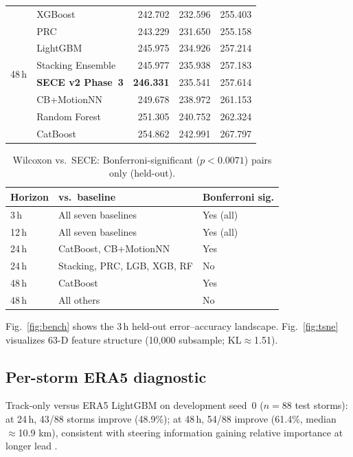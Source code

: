\documentclass[11pt]{article}
\newcommand{\sece}{SECE}
\newcommand{\era}{ERA5}
\newcommand{\km}{\,km}
\newcommand{\bonf}{0.0071}
\begin{document}
\begin{table}[t]
\begin{tabular}{@{}llrrr@{}}
\midrule
\multirow{8}{*}{48\,h}
  & XGBoost & 242.702 & 232.596 & 255.403 \\
  & PRC & 243.229 & 231.650 & 255.158 \\
  & LightGBM & 245.975 & 234.926 & 257.214 \\
  & Stacking Ensemble & 245.977 & 235.938 & 257.183 \\
  & \textbf{\sece{} v2 Phase~3} & \textbf{246.331} & 235.541 & 257.614 \\
  & CB+MotionNN & 249.678 & 238.972 & 261.153 \\
  & Random Forest & 251.305 & 240.752 & 262.324 \\
  & CatBoost & 254.862 & 242.991 & 267.797 \\
\bottomrule
\end{tabular}
\end{table}

\begin{table}[ht]
\caption{Wilcoxon vs.\ \sece{}: Bonferroni-significant ($p<\bonf$) pairs only (held-out).}
\label{tab:wilcox}
\centering
\scriptsize
\begin{tabular}{@{}lll@{}}
\toprule
Horizon & vs.\ baseline & Bonferroni sig. \\
\midrule
3\,h & All seven baselines & Yes (all) \\
12\,h & All seven baselines & Yes (all) \\
24\,h & CatBoost, CB+MotionNN & Yes \\
24\,h & Stacking, PRC, LGB, XGB, RF & No \\
48\,h & CatBoost & Yes \\
48\,h & All others & No \\
\bottomrule
\end{tabular}
\end{table}

Fig.~\ref{fig:bench} shows the 3\,h held-out error--accuracy landscape.
Fig.~\ref{fig:tsne} visualizes 63-D feature structure (10{,}000 subsample; KL$\approx$1.51).

\subsection{Per-storm \era{} diagnostic}
Track-only versus \era{} LightGBM on development seed~0 ($n=88$ test storms): at 24\,h, 43/88 storms improve (48.9\%); at 48\,h, 54/88 improve (61.4\%, median $\approx$10.9\,\km{}), consistent with steering information gaining relative importance at longer lead \cite{ritchie2014,barnes2013}.
\end{document}
